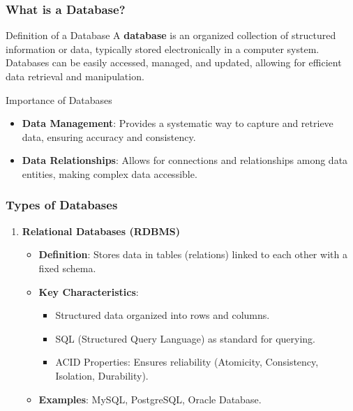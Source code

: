 \documentclass[aspectratio=169]{beamer}
\begin{document}
\begin{frame}[fragile]
    \frametitle{What is a Database?}
    \begin{block}{Definition of a Database}
        A \textbf{database} is an organized collection of structured information or data, typically stored electronically in a computer system. Databases can be easily accessed, managed, and updated, allowing for efficient data retrieval and manipulation.
    \end{block}
    \begin{block}{Importance of Databases}
        \begin{itemize}
            \item \textbf{Data Management}: Provides a systematic way to capture and retrieve data, ensuring accuracy and consistency.
            \item \textbf{Data Relationships}: Allows for connections and relationships among data entities, making complex data accessible.
        \end{itemize}
    \end{block}
\end{frame}

\begin{frame}[fragile]
    \frametitle{Types of Databases}
    \begin{enumerate}
        \item \textbf{Relational Databases (RDBMS)}
        \begin{itemize}
            \item \textbf{Definition}: Stores data in tables (relations) linked to each other with a fixed schema.
            \item \textbf{Key Characteristics}:
            \begin{itemize}
                \item Structured data organized into rows and columns.
                \item SQL (Structured Query Language) as standard for querying.
                \item ACID Properties: Ensures reliability (Atomicity, Consistency, Isolation, Durability).
            \end{itemize}
            \item \textbf{Examples}: MySQL, PostgreSQL, Oracle Database.
        \end{itemize}
    \end{enumerate}
\end{frame}
\end{document}

